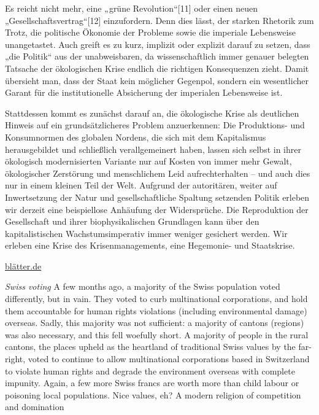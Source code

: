 \documentclass[
]{book}
\begin{document}
Es reicht nicht mehr, eine „grüne Revolution``{[}11{]} oder einen neuen „Gesellschaftsvertrag``{[}12{]} einzufordern. Denn dies lässt, der starken Rhetorik zum Trotz, die politische Ökonomie der Probleme sowie die imperiale Lebensweise unangetastet. Auch greift es zu kurz, implizit oder explizit darauf zu setzen, dass „die Politik`` aus der unabweisbaren, da wissenschaftlich immer genauer belegten Tatsache der ökologischen Krise endlich die richtigen Konsequenzen zieht. Damit übersieht man, dass der Staat kein möglicher Gegenpol, sondern ein wesentlicher Garant für die institutionelle Absicherung der imperialen Lebensweise ist.

Stattdessen kommt es zunächst darauf an, die ökologische Krise als deutlichen Hinweis auf ein grundsätzlicheres Problem anzuerkennen: Die Produktions- und Konsumnormen des globalen Nordens, die sich mit dem Kapitalismus herausgebildet und schließlich verallgemeinert haben, lassen sich selbst in ihrer ökologisch modernisierten Variante nur auf Kosten von immer mehr Gewalt, ökologischer Zerstörung und menschlichem Leid aufrechterhalten -- und auch dies nur in einem kleinen Teil der Welt. Aufgrund der autoritären, weiter auf Inwertsetzung der Natur und gesellschaftliche Spaltung setzenden Politik erleben wir derzeit eine beispiellose Anhäufung der Widersprüche. Die Reproduktion der Gesellschaft und ihrer biophysikalischen Grundlagen kann über den kapitalistischen Wachstumsimperativ immer weniger gesichert werden. Wir erleben eine Krise des Krisenmanagements, eine Hegemonie- und Staatskrise.

\href{https://www.blaetter.de/ausgabe/2017/mai/unsere-schoene-imperiale-lebensweise}{blätter.de}

\emph{Swiss voting}
A few months ago, a majority of the Swiss population voted differently, but in vain. They voted to curb multinational corporations, and hold them accountable for human rights violations (including environmental damage) overseas. Sadly, this majority was not sufficient: a majority of cantons (regions) was also necessary, and this fell woefully short. A majority of people in the rural cantons, the places upheld as the heartland of traditional Swiss values by the far-right, voted to continue to allow multinational corporations based in Switzerland to violate human rights and degrade the environment overseas with complete impunity. Again, a few more Swiss francs are worth more than child labour or poisoning local populations. Nice values, eh?
A modern religion of competition and domination
\end{document}
